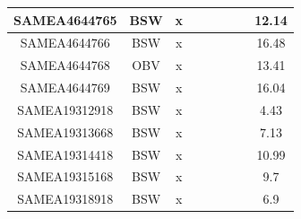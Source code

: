 \documentclass[../main.tex]{subfiles}
\begin{document}
\begin{flushleft}
\begin{footnotesize}
\begin{longtable}{|c|c|c|c|c|c|c|}
    \hline
    SAMEA4644765  & BSW   & x                                                            & ~          & ~                                                                           & ~                                                                 & 12.14     \\ 
    \hline
    SAMEA4644766  & BSW   & x                                                            & ~          & ~                                                                           & ~                                                                 & 16.48     \\ 
    \hline
    SAMEA4644768  & OBV   & x                                                            & ~          & ~                                                                           & ~                                                                 & 13.41     \\ 
    \hline
    SAMEA4644769  & BSW   & x                                                            & ~          & ~                                                                           & ~                                                                 & 16.04     \\ 
    \hline
    SAMEA19312918 & BSW   & x                                                            & ~          & ~                                                                           & ~                                                                 & 4.43      \\ 
    \hline
    SAMEA19313668 & BSW   & x                                                            & ~          & ~                                                                           & ~                                                                 & 7.13      \\ 
    \hline
    SAMEA19314418 & BSW   & x                                                            & ~          & ~                                                                           & ~                                                                 & 10.99     \\ 
    \hline
    SAMEA19315168 & BSW   & x                                                            & ~          & ~                                                                           & ~                                                                 & 9.7       \\ 
    \hline
    SAMEA19318918 & BSW   & x                                                            & ~          & ~                                                                           & ~                                                                 & 6.9       \\ 

\end{longtable}
\end{footnotesize}
\end{flushleft}
\end{document}
